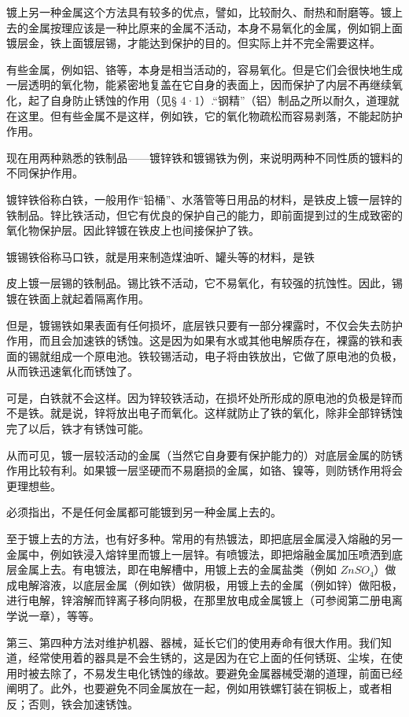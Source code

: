 镀上另一种金属这个方法具有较多的优点，譬如，比较耐久、耐热和耐磨等。镀上去的金属按理应该是一种比原来的金属不活动，本身不易氧化的金属，例如铜上面镀层金，铁上面镀层锡，才能达到保护的目的。但实际上并不完全需要这样。

有些金属，例如铝、铬等，本身是相当活动的，容易氧化。但是它们会很快地生成一层透明的氧化物，能紧密地复盖在它自身的表面上，因而保护了内层不再继续氧化，起了自身防止锈蚀的作用（见§
4·1）.``钢精''（铝）制品之所以耐久，道理就在这里。但有些金属不是这样，例如铁，它的氧化物疏松而容易剥落，不能起防护作用。

现在用两种熟悉的铁制品------镀锌铁和镀锡铁为例，来说明两种不同性质的镀料的不同保护作用。

镀锌铁俗称白铁，一般用作``铅桶''、水落管等日用品的材料，是铁皮上镀一层锌的铁制品。锌比铁活动，但它有优良的保护自己的能力，即前面提到过的生成致密的氧化物保护层。因此锌镀在铁皮上也间接保护了铁。

镀锡铁俗称马口铁，就是用来制造煤油听、罐头等的材料，是铁

皮上镀一层锡的铁制品。锡比铁不活动，它不易氧化，有较强的抗蚀性。因此，锡镀在铁面上就起着隔离作用。

但是，镀锡铁如果表面有任何损坏，底层铁只要有一部分裸露时，不仅会失去防护作用，而且会加速铁的锈蚀。这是因为如果有水或其他电解质存在，裸露的铁和表面的锡就组成一个原电池。铁较锡活动，电子将由铁放出，它做了原电池的负极，从而铁迅速氧化而锈蚀了。

可是，白铁就不会这样。因为锌较铁活动，在损坏处所形成的原电池的负极是锌而不是铁。就是说，锌将放出电子而氧化。这样就防止了铁的氧化，除非全部锌锈蚀完了以后，铁才有锈蚀可能。

从而可见，镀一层较活动的金属（当然它自身要有保护能力的）对底层金属的防锈作用比较有利。如果镀一层坚硬而不易磨损的金属，如铬、镍等，则防锈作用将会更理想些。

必须指出，不是任何金属都可能镀到另一种金属上去的。

至于镀上去的方法，也有好多种。常用的有热镀法，即把底层金属浸入熔融的另一金属中，例如铁浸入熔锌里而镀上一层锌。有喷镀法，即把熔融金属加压喷洒到底层金属上去。有电镀法，即在电解槽中，用镀上去的金属盐类（例如
\(ZnSO_{4}\)）做成电解溶液，以底层金属（例如铁）做阴极，用镀上去的金属（例如锌）做阳极，进行电解，锌溶解而锌离子移向阴极，在那里放电成金属镀上（可参阅第二册电离学说一章），等等。

第三、第四种方法对维护机器、器械，延长它们的使用寿命有很大作用。我们知道，经常使用着的器具是不会生锈的，这是因为在它上面的任何锈斑、尘埃，在使用时被去除了，不易发生电化锈蚀的缘故。要避免金属器械受潮的道理，前面已经阐明了。此外，也要避免不同金属放在一起，例如用铁螺钉装在铜板上，或者相反；否则，铁会加速锈蚀。

